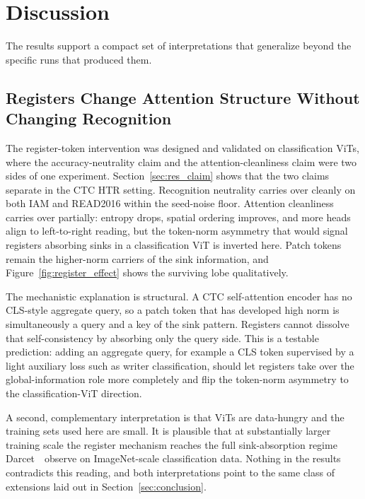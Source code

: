 \section{Discussion}
\label{sec:discussion}

The results support a compact set of interpretations that generalize beyond the specific runs that produced them.

\subsection{Registers Change Attention Structure Without Changing Recognition}
\label{sec:disc_registers}

The register-token intervention was designed and validated on classification ViTs, where the accuracy-neutrality claim and the attention-cleanliness claim were two sides of one experiment. Section~\ref{sec:res_claim} shows that the two claims separate in the CTC HTR setting. Recognition neutrality carries over cleanly on both IAM and READ2016 within the seed-noise floor. Attention cleanliness carries over partially: entropy drops, spatial ordering improves, and more heads align to left-to-right reading, but the token-norm asymmetry that would signal registers absorbing sinks in a classification ViT is inverted here. Patch tokens remain the higher-norm carriers of the sink information, and Figure~\ref{fig:register_effect} shows the surviving lobe qualitatively.

The mechanistic explanation is structural. A CTC self-attention encoder has no CLS-style aggregate query, so a patch token that has developed high norm is simultaneously a query and a key of the sink pattern. Registers cannot dissolve that self-consistency by absorbing only the query side. This is a testable prediction: adding an aggregate query, for example a CLS token supervised by a light auxiliary loss such as writer classification, should let registers take over the global-information role more completely and flip the token-norm asymmetry to the classification-ViT direction.

A second, complementary interpretation is that ViTs are data-hungry and the training sets used here are small. It is plausible that at substantially larger training scale the register mechanism reaches the full sink-absorption regime Darcet~\etal\ observe on ImageNet-scale classification data. Nothing in the results contradicts this reading, and both interpretations point to the same class of extensions laid out in Section~\ref{sec:conclusion}.

